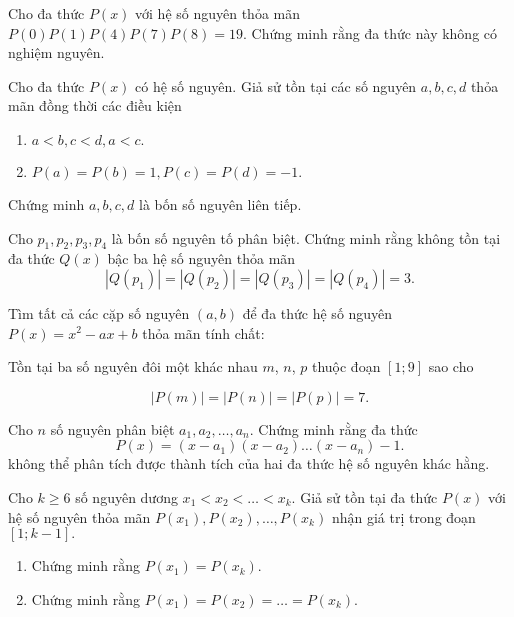 \begin{btt}
Cho đa thức $P(x)$ với hệ số nguyên thỏa mãn $P(0)P(1)P(4)P(7)P(8)=19.$ Chứng minh rằng đa thức này không có nghiệm nguyên.
\end{btt}

\begin{btt}
Cho đa thức $P(x)$ có hệ số nguyên. Giả sử tồn tại các số nguyên $a,b,c,d$ thỏa mãn đồng thời các điều kiện
\begin{enumerate}[i,]
    \item $a<b,c<d,a<c.$
    \item$P(a)=P(b)=1,P(c)=P(d)=-1.$
\end{enumerate}
Chứng minh $a,b,c,d$ là bốn số nguyên liên tiếp.

\end{btt}

\begin{btt}
Cho $p_{1}, p_{2}, p_{3}, p_{4}$ là bốn số nguyên tố phân biệt. Chứng minh rằng không tồn tại đa thức $Q(x)$ bậc ba hệ số nguyên thỏa mãn $$\left|Q\left(p_{1}\right)\right|=\left|Q\left(p_{2}\right)\right|=\left|Q\left(p_{3}\right)\right|=\left|Q\left(p_{4}\right)\right|=3.$$
\end{btt}    

\begin{btt}
Tìm tất cả các cặp số nguyên $(a,b)$ để đa thức hệ số nguyên $P(x)=x^2-ax+b$ thỏa mãn tính chất:
\begin{it}
Tồn tại ba số nguyên đôi một khác nhau $m$, $n$, $p$ thuộc đoạn $[1;9]$ sao cho
\end{it}
	$$|P(m)|=|P(n)|=|P(p)|=7.$$
\end{btt}

\begin{btt}
Cho $n$ số nguyên phân biệt $a_{1}, a_{2}, \ldots, a_{n}$. Chứng minh rằng đa thức
$$P(x)=\left(x-a_{1}\right)\left(x-a_{2}\right) \ldots\left(x-a_{n}\right)-1.$$
không thể phân tích được thành tích của hai đa thức hệ số nguyên khác hằng.
\end{btt}

\begin{btt}
Cho $k\ge 6$ số nguyên dương $x_1<x_2<\ldots<x_k.$ Giả sử tồn tại đa thức $P(x)$ với hệ số nguyên thỏa mãn $P\left(x_1\right),P\left(x_2\right),\ldots,P\left(x_k\right)$ nhận giá trị trong đoạn $[1;k-1].$
\begin{enumerate}[a,]
    \item Chứng minh rằng $P\left(x_1\right)=P\left(x_k\right).$
    \item Chứng minh rằng $P\left(x_1\right)=P\left(x_2\right)=\ldots=P\left(x_k\right).$
\end{enumerate}
\end{btt}

